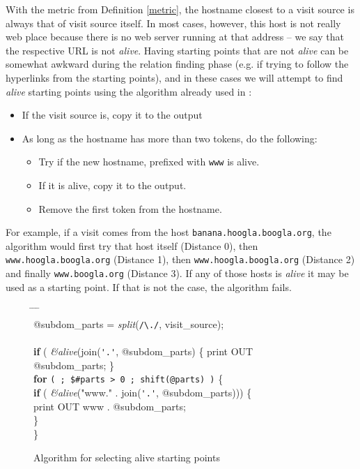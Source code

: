 \documentclass[a4paper]{danarticle}
\theoremstyle{remark}
\begin{document}
       With the metric from Definition \ref{metric}, the hostname closest to a
       visit source is always that of visit source itself. In most cases,
       however, this host is not really web place because there is no web server
       running at that address -- we say that the respective URL is not
       \textit{alive}. Having starting points that are not \textit{alive} can
       be somewhat awkward during the relation finding phase (e.g. if trying to
       follow the hyperlinks from the starting points), and in these cases we
       will attempt to find \textit{alive} starting points using the algorithm
       already used in \cite{webaware}:
       
       \begin{itemize}
         \item{If the visit source is, copy it to the output}
	 \item{As long as the hostname has more than two tokens, do the
	 following:}
	 \begin{itemize}
	   \item{Try if the new hostname, prefixed with \verb$www$ is alive.}
	   \item{If it is alive, copy it to the output.}
	   \item{Remove the first token from the hostname.}
	 \end{itemize}
       \end{itemize}
       
       For example, if a visit comes from the host
       \verb$banana.hoogla.boogla.org$, the algorithm would first try that
       host itself (Distance 0), then \verb$www.hoogla.boogla.org$ (Distance 1),
       then \verb$www.hoogla.boogla.org$ (Distance 2) and finally
       \verb$www.boogla.org$ (Distance 3). If any of those hosts is
       \textit{alive} it may be used as a starting point. If that is not the
       case, the algorithm fails.
       \begin{figure}[ht]
         {\ttfamily
         \begin{tabbing}
           \hspace{5mm} \= \hspace{5mm} \= \hspace{5mm} \= \hspace{5mm} \= \\
	   @subdom\_parts = \textit{split}(\verb$/\./$, visit\_source); \\
	   \\
	   \textbf{if} ( \textit{\&alive}(join(\verb$'.'$, @subdom\_parts) \{
	   print OUT @subdom\_parts; \} \\
	   \textbf{for} \verb-( ; $#parts > 0 ; shift(@parts) )- \{ \\
	   \>  \textbf{if} ( \textit{\&alive}("www." . join(\verb$'.'$,
    	   @subdom\_parts))) \{ \\
	   \> \> print OUT www . @subdom\_parts; \\
	   \> \} \\
	   \} \\
         \end{tabbing}}
	 \caption{Algorithm for selecting alive starting points}
	 \label{domaintest}
       \end{figure}
\end{document}
